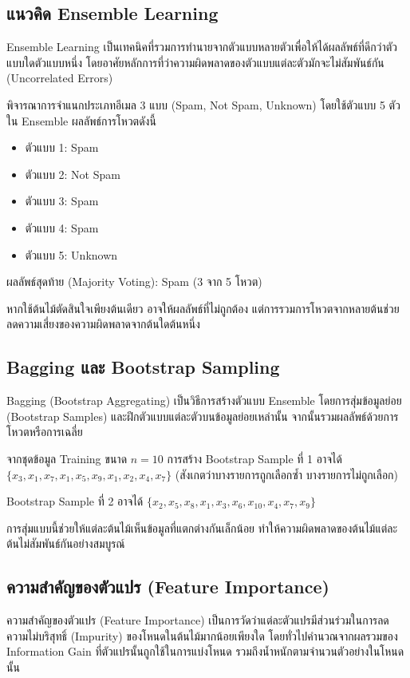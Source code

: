 \subsection{แนวคิด Ensemble Learning}
Ensemble Learning เป็นเทคนิคที่รวมการทำนายจากตัวแบบหลายตัวเพื่อให้ได้ผลลัพธ์ที่ดีกว่าตัวแบบใดตัวแบบหนึ่ง โดยอาศัยหลักการที่ว่าความผิดพลาดของตัวแบบแต่ละตัวมักจะไม่สัมพันธ์กัน (Uncorrelated Errors)

\begin{exmp}
\label{exmp:ensemble_voting}
พิจารณาการจำแนกประเภทอีเมล 3 แบบ (Spam, Not Spam, Unknown) โดยใช้ตัวแบบ 5 ตัวใน Ensemble ผลลัพธ์การโหวตดังนี้

\begin{itemize}
\item ตัวแบบ 1: Spam
\item ตัวแบบ 2: Not Spam
\item ตัวแบบ 3: Spam
\item ตัวแบบ 4: Spam
\item ตัวแบบ 5: Unknown
\end{itemize}

ผลลัพธ์สุดท้าย (Majority Voting): Spam (3 จาก 5 โหวต)

หากใช้ต้นไม้ตัดสินใจเพียงต้นเดียว อาจให้ผลลัพธ์ที่ไม่ถูกต้อง แต่การรวมการโหวตจากหลายต้นช่วยลดความเสี่ยงของความผิดพลาดจากต้นใดต้นหนึ่ง
\end{exmp}

\subsection{Bagging และ Bootstrap Sampling}
Bagging (Bootstrap Aggregating) เป็นวิธีการสร้างตัวแบบ Ensemble โดยการสุ่มข้อมูลย่อย (Bootstrap Samples) และฝึกตัวแบบแต่ละตัวบนข้อมูลย่อยเหล่านั้น จากนั้นรวมผลลัพธ์ด้วยการโหวตหรือการเฉลี่ย

\begin{exmp}
\label{exmp:bagging_example}
จากชุดข้อมูล Training ขนาด $n = 10$ การสร้าง Bootstrap Sample ที่ 1 อาจได้ $\{x_3, x_1, x_7, x_1, x_5, x_9, x_1, x_2, x_4, x_7\}$ (สังเกตว่าบางรายการถูกเลือกซ้ำ บางรายการไม่ถูกเลือก)

Bootstrap Sample ที่ 2 อาจได้ $\{x_2, x_5, x_8, x_1, x_3, x_6, x_10, x_4, x_7, x_9\}$

การสุ่มแบบนี้ช่วยให้แต่ละต้นไม้เห็นข้อมูลที่แตกต่างกันเล็กน้อย ทำให้ความผิดพลาดของต้นไม้แต่ละต้นไม่สัมพันธ์กันอย่างสมบูรณ์
\end{exmp}

\subsection{ความสำคัญของตัวแปร (Feature Importance)}
ความสำคัญของตัวแปร (Feature Importance) เป็นการวัดว่าแต่ละตัวแปรมีส่วนร่วมในการลดความไม่บริสุทธิ์ (Impurity) ของโหนดในต้นไม้มากน้อยเพียงใด โดยทั่วไปคำนวณจากผลรวมของ Information Gain ที่ตัวแปรนั้นถูกใช้ในการแบ่งโหนด รวมถึงน้ำหนักตามจำนวนตัวอย่างในโหนดนั้น

